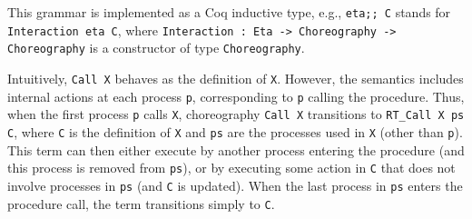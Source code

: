 \documentclass[runningheads]{llncs}
\begin{document}
This grammar is implemented as a Coq inductive type, e.g., \lstinline+eta;; C+ stands for \lstinline+Interaction eta C+, where \lstinline+Interaction : Eta -> Choreography -> Choreography+ is a constructor of type \lstinline+Choreography+.




Intuitively, \lstinline+Call X+ behaves as the definition of \lstinline+X+.
However, the semantics includes internal actions at each process \lstinline+p+, corresponding to
\lstinline+p+ calling the procedure.
Thus, when the first process \lstinline+p+ calls \lstinline+X+, choreography \lstinline+Call X+ transitions to \lstinline+RT_Call X ps C+, where \lstinline+C+ is the definition of \lstinline+X+ and
\lstinline+ps+ are the processes used in \lstinline+X+ (other than \lstinline+p+).
This term can then either execute by another process entering the procedure (and this process is
removed from \lstinline+ps+), or by executing some action in \lstinline+C+ that does not involve
processes in \lstinline+ps+ (and \lstinline+C+ is updated).
When the last process in \lstinline+ps+ enters the procedure call, the term transitions simply to
\lstinline+C+.
\end{document}
